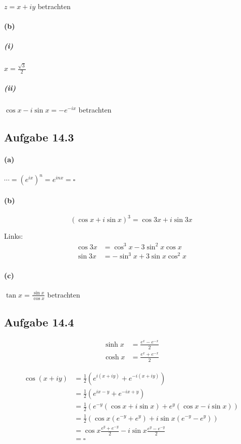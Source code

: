 $z=x+iy$ betrachten

\paragraph{(b)}

\subparagraph{(i)}

$x=\frac{\sqrt{3}}{2}$

\subparagraph{(ii)}

$\cos x-i\sin x=-e^{-ix}$ betrachten

\subsection{Aufgabe 14.3}

\paragraph{(a)}

$\cdots=(e^{ix})^n=e^{inx}=\square$

\paragraph{(b)}

\begin{equation*}
(\cos x+i\sin x)^3=\cos3x+i\sin3x
\end{equation*}

Links:
\begin{align*}
\cos3x&=\cos^3x-3\sin^2x\cos x\\
\sin3x&=-\sin^3x+3\sin x\cos^2x
\end{align*}

\paragraph{(c)}

$\tan x=\frac{\sin x}{\cos x}$ betrachten

\newpage

\subsection{Aufgabe 14.4}

\begin{align*}
\sinh x&=\frac{e^x-e^{-x}}{2}\\
\cosh x&=\frac{e^x+e^{-x}}{2}
\end{align*}

\begin{align*}
\cos(x+iy)
&=\frac{1}{2}(e^{i(x+iy)}+e^{-i(x+iy)})\\
&=\frac{1}{2}(e^{ix-y}+e^{-ix+y})\\
&=\frac{1}{2}(e^{-y}(\cos x+i\sin x)+e^y(\cos x-i\sin x))\\
&=\frac{1}{2}(\cos x(e^{-y}+e^y)+i\sin x(e^{-y}-e^y))\\
&=\cos x\frac{e^y+e^{-y}}{2}-i\sin x\frac{e^y-e^{-y}}{2}\\
&=\square
\end{align*}
